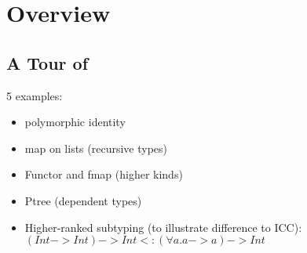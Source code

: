 \section{Overview}

\subsection{A Tour of \name}

5 examples:

\begin{itemize}
\item polymorphic identity
\item map on lists (recursive types)
\item Functor and fmap (higher kinds)
\item Ptree (dependent types)
\item Higher-ranked subtyping (to illustrate difference to ICC):
  $(Int -> Int) -> Int <: (\forall a . a -> a) -> Int$
\end{itemize}

